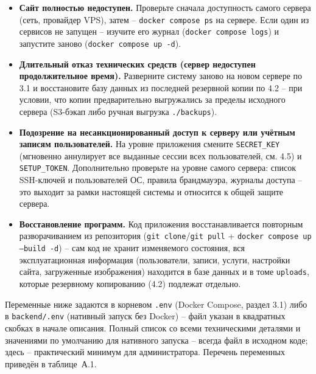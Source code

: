 \begin{itemize}
  \item \textbf{Сайт полностью недоступен.} Проверьте сначала
        доступность самого сервера (сеть, провайдер VPS), затем --
        \texttt{docker compose ps} на сервере. Если один из сервисов
        не запущен -- изучите его журнал (\texttt{docker compose logs})
        и запустите заново (\texttt{docker compose up -d}).
  \item \textbf{Длительный отказ технических средств (сервер
        недоступен продолжительное время).} Разверните систему заново
        на новом сервере по 3.1 и восстановите базу данных из
        последней резервной копии по 4.2 -- при условии, что копии
        предварительно выгружались за пределы исходного сервера
        (S3-бэкап либо ручная выгрузка \texttt{./backups}).
  \item \textbf{Подозрение на несанкционированный доступ к серверу или
        учётным записям пользователей.} На уровне приложения смените
        \texttt{SECRET\_KEY} (мгновенно аннулирует все выданные сессии
        всех пользователей, см. 4.5) и \texttt{SETUP\_TOKEN}.
        Дополнительно проверьте на уровне самого сервера: список
        SSH-ключей и пользователей ОС, правила брандмауэра, журналы
        доступа -- это выходит за рамки настоящей системы и относится к
        общей защите сервера.
  \item \textbf{Восстановление программ.} Код приложения восстанавливается
        повторным разворачиванием из репозитория
        (\texttt{git clone}/\texttt{git pull} + \texttt{docker compose
        up --build -d}) -- сам код не хранит изменяемого состояния,
        вся эксплуатационная информация (пользователи, записи, услуги,
        настройки сайта, загруженные изображения) находится в базе
        данных и в томе \texttt{uploads}, которые резервному
        копированию (4.2) подлежат отдельно.
\end{itemize}

\clearpage
\appendix


Переменные ниже задаются в корневом \texttt{.env} (Docker Compose,
раздел 3.1) либо в \texttt{backend/.env} (нативный запуск без
Docker) -- файл указан в квадратных скобках в начале описания. Полный
список со всеми техническими деталями и значениями по умолчанию для
нативного запуска -- всегда файл  в
исходном коде; здесь -- практический минимум для администратора. Перечень
переменных приведён в таблице~А.1.

